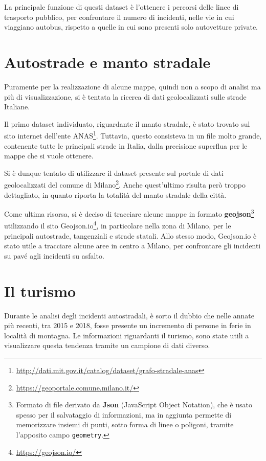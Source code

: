 \documentclass[a4paper,12pt]{report}
\newcommand{\columnstyle}[1]{\texttt{#1}}
\newcommand{\engstyle}[1]{\textbf{#1}}
\begin{document}
La principale funzione di questi dataset è l'ottenere i percorsi delle linee di trasporto pubblico, 
per confrontare il numero di incidenti, nelle vie in cui viaggiano autobus, rispetto a 
quelle in cui sono presenti solo autovetture private. 

\section{Autostrade e manto stradale}

Puramente per la realizzazione di alcune mappe, quindi non a scopo di analisi 
ma più di visualizzazione, si è tentata la ricerca di dati geolocalizzati sulle 
strade Italiane. 

Il primo dataset individuato, riguardante il manto  stradale, è stato trovato sul sito 
internet dell'ente  
ANAS\footnote{\url{http://dati.mit.gov.it/catalog/dataset/grafo-stradale-anas}}. 
Tuttavia, questo consisteva in un file molto grande, contenente tutte le principali 
strade in Italia, dalla precisione superflua per le mappe che si vuole ottenere. 

Si è dunque tentato di utilizzare il dataset presente sul portale di dati geolocalizzati 
del comune di Milano\footnote{\url{https://geoportale.comune.milano.it/}}. 
Anche quest'ultimo risulta però troppo dettagliato, in quanto riporta la 
totalità del manto stradale della città. 

Come ultima risorsa, si è deciso di tracciare alcune mappe in formato 
\engstyle{geojson}\footnote{Formato di file derivato da \engstyle{Json} 
(JavaScript Object Notation), che è usato spesso per il salvataggio di informazioni, ma 
in aggiunta permette di memorizzare insiemi di punti, sotto forma di linee o poligoni, 
tramite l'apposito campo \columnstyle{geometry}.} utilizzando il sito 
Geojson.io\footnote{\url{https://geojson.io/}}, in particolare nella zona di Milano, 
per le principali autostrade, tangenziali e strade statali. 
Allo stesso modo, Geojson.io è stato utile a tracciare alcune aree in centro a Milano, 
per confrontare gli incidenti su pavé agli incidenti su asfalto. 

\section{Il turismo}

Durante le analisi degli incidenti autostradali, è sorto il dubbio che 
nelle annate più recenti, tra 2015 e 2018, 
fosse presente un incremento di persone in ferie in località di montagna. 
Le informazioni riguardanti il turismo, sono state utili a visualizzare questa tendenza 
tramite un campione di dati diverso. 
\end{document}
